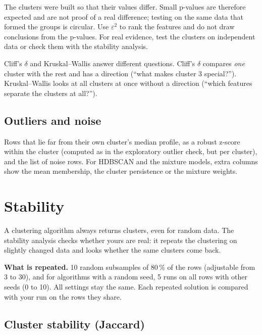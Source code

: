 \documentclass[11pt,a4paper]{article}
\begin{document}
\begin{note}
The clusters were built so that their values differ. Small p-values are therefore expected and are not proof of a
real difference; testing on the same data that formed the groups is circular. Use $\varepsilon^2$ to rank the
features and do not draw conclusions from the p-values. For real evidence, test the clusters on independent data or
check them with the stability analysis.
\end{note}

Cliff's $\delta$ and Kruskal--Wallis answer different questions. Cliff's $\delta$ compares \emph{one} cluster
with the rest and has a direction (``what makes cluster 3 special?''). Kruskal--Wallis looks at all clusters at once
without a direction (``which features separate the clusters at all?'').

\subsection{Outliers and noise}

Rows that lie far from their own cluster's median profile, as a robust z-score within the cluster (computed as in
the exploratory outlier check, but per cluster), and the list of noise rows. For HDBSCAN and the mixture models,
extra columns show the mean membership, the cluster persistence or the mixture weights.

\section{Stability}
\label{sec:stability}

A clustering algorithm always returns clusters, even for random data. The stability analysis checks whether yours
are real: it repeats the clustering on slightly changed data and looks whether the same clusters come back.

\textbf{What is repeated.} 10 random subsamples of 80\,\% of the rows (adjustable from 3 to 30), and for algorithms
with a random seed, 5 runs on all rows with other seeds (0 to 10). All settings stay the same. Each repeated
solution is compared with your run on the rows they share.

\subsection{Cluster stability (Jaccard)}
\end{document}
